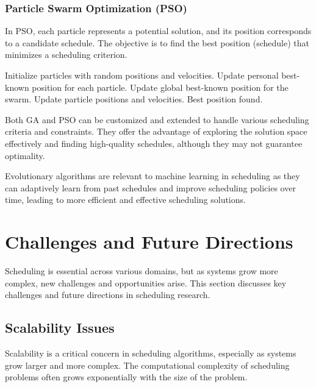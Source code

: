 \documentclass[12pt]{book} %
\begin{document}
\subsubsection{Particle Swarm Optimization (PSO)}

In PSO, each particle represents a potential solution, and its position corresponds to a candidate schedule. The objective is to find the best position (schedule) that minimizes a scheduling criterion.
\FloatBarrier
\begin{algorithm}
\caption{Particle Swarm Optimization for Job Scheduling}
\begin{algorithmic}[1]
\State Initialize particles with random positions and velocities.
    \State Update personal best-known position for each particle.
    \State Update global best-known position for the swarm.
    \State Update particle positions and velocities.
\EndFor
\Return Best position found.
\end{algorithmic}
\end{algorithm}
\FloatBarrier
Both GA and PSO can be customized and extended to handle various scheduling criteria and constraints. They offer the advantage of exploring the solution space effectively and finding high-quality schedules, although they may not guarantee optimality.

Evolutionary algorithms are relevant to machine learning in scheduling as they can adaptively learn from past schedules and improve scheduling policies over time, leading to more efficient and effective scheduling solutions.


\section{Challenges and Future Directions}

Scheduling is essential across various domains, but as systems grow more complex, new challenges and opportunities arise. This section discusses key challenges and future directions in scheduling research.

\subsection{Scalability Issues}

Scalability is a critical concern in scheduling algorithms, especially as systems grow larger and more complex. The computational complexity of scheduling problems often grows exponentially with the size of the problem. 
\end{document}

